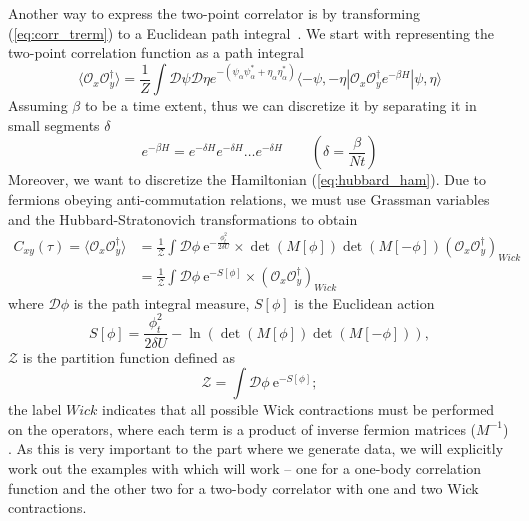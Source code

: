 Another way to express the two-point correlator is by transforming (\cref{eq:corr_trerm}) to a Euclidean path integral~\cite{discret1,discret2}. We start with representing the two-point correlation function as a path integral
\begin{equation}
    \langle \mathcal{O}_x\mathcal{O}^\dagger_y \rangle = \frac{1}{Z} \int \mathcal{D}\psi\mathcal{D}\eta e^{-(\psi_\alpha\psi^*_\alpha + \eta_\alpha\eta^*_\alpha)} \langle -\psi,-\eta | \mathcal{O}_x\mathcal{O}^\dagger_y e^{-\beta H} | \psi,\eta \rangle
\end{equation}
Assuming $\beta$ to be a time extent, thus we can discretize it by separating it in small segments $\delta$
\begin{equation}
    e^{-\beta H} = e^{-\delta H}e^{-\delta H}\dots e^{-\delta H}\qquad(\delta = \frac{\beta}{Nt})
\end{equation}
Moreover, we want to discretize the Hamiltonian (\cref{eq:hubbard_ham}). Due to fermions obeying anti-commutation relations, we must use Grassman variables and the Hubbard-Stratonovich transformations to obtain
\begin{equation}
    \begin{aligned}
        C_{xy}(\tau) = \langle \mathcal{O}_x\mathcal{O}^\dagger_y \rangle &= \frac{1}{\mathcal{Z}} \int \mathcal{D}\phi \:\mathrm{e}^{-\frac{\phi^2_t}{2\delta U}}\times \det(M[\phi])\det(M[-\phi]) \left(\mathcal{O}_x\mathcal{O}^\dagger_y\right)_{Wick}
        \\
        &= \frac{1}{\mathcal{Z}} \int \mathcal{D}\phi \:\mathrm{e}^{-S[\phi]}\times \left(\mathcal{O}_x\mathcal{O}^\dagger_y\right)_{Wick}
    \end{aligned}
    \label{eq:path-int}
\end{equation}
where $\mathcal{D}\phi$ is the path integral measure, $S[\phi]$ is the Euclidean action
\begin{equation}
    S[\phi] = \frac{\phi^2_t}{2\delta U} - \ln(\det(M[\phi])\det(M[-\phi])),
\end{equation} 
$\mathcal{Z}$ is the partition function defined as
\begin{equation}
    \mathcal{Z} = \int \mathcal{D}\phi \:\mathrm{e}^{-S[\phi]};
\end{equation}
the label $Wick$ indicates that all possible Wick contractions must be performed on the operators, where each term is a product of inverse fermion matrices ($M^{-1}$) \cite{gattringer}. As this is very important to the part where we generate data, we will explicitly work out the examples with which will work -- one for a one-body correlation function and the other two for a two-body correlator with one and two Wick contractions.

